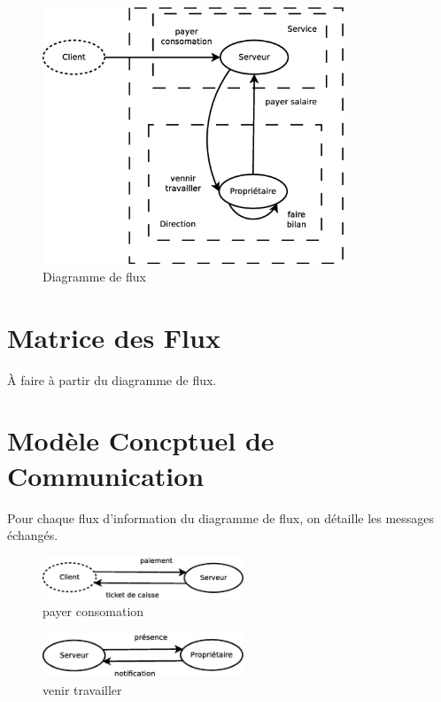 \begin{figure}[!htb]
    \begin{center}
    \includegraphics[width=9cm]{images/cc1_df2.eps}
    \caption{\label{cc1_df3} Diagramme de flux}
    \end{center}
\end{figure}

\section*{Matrice des Flux}

À faire à partir du diagramme de flux.

\newpage
\section*{Modèle Concptuel de Communication}

Pour chaque flux d'information du diagramme de flux, on détaille les messages échangés.

\begin{figure}[!htb]
    \begin{center}
    \includegraphics[width=6cm]{images/cc1_mcc1.eps}
    \caption{\label{cc1_mcc1} payer consomation}
    \end{center}
\end{figure}

\begin{figure}[!htb]
    \begin{center}
    \includegraphics[width=6cm]{images/cc1_mcc2.eps}
    \caption{\label{cc1_mcc2} venir travailler}
    \end{center}
\end{figure}

